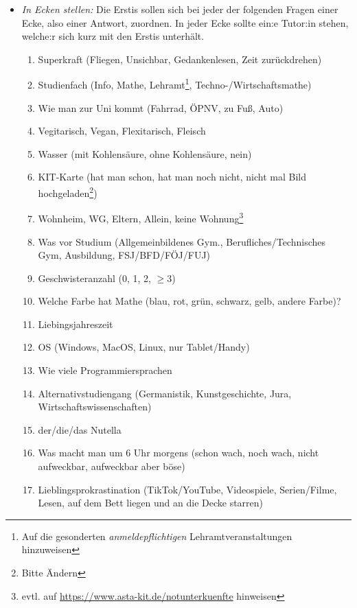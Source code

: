 \documentclass[10pt,ngerman]{scrartcl}
\begin{document}
\begin{multicols}{2}
\begin{itemize}
    \item \emph{In Ecken stellen:} Die Erstis sollen sich bei jeder der
        folgenden Fragen einer Ecke, also einer Antwort, zuordnen. In jeder Ecke
        sollte ein:e Tutor:in stehen, welche:r sich kurz mit den Erstis
        unterhält.
        \begin{enumerate}
            \item Superkraft (Fliegen, Unsichbar, Gedankenlesen, Zeit zurückdrehen)
            \item Studienfach (Info, Mathe, Lehramt\footnote{Auf die gesonderten \emph{anmeldepflichtigen} Lehramtveranstaltungen hinzuweisen}, Techno-/Wirtschaftsmathe)
            \item Wie man zur Uni kommt (Fahrrad, ÖPNV, zu Fuß, Auto)
            \item Vegitarisch, Vegan, Flexitarisch, Fleisch
            \item Wasser (mit Kohlensäure, ohne Kohlensäure, nein)
            \item KIT-Karte (hat man schon, hat man noch nicht, nicht mal Bild hochgeladen\footnote{Bitte Ändern})
            \item Wohnheim, WG, Eltern, Allein, keine Wohnung\footnote{evtl. auf \href{https://www.asta-kit.de/notunterkuenfte}{https://www.asta-kit.de/notunterkuenfte} hinweisen}
            \item Was vor Studium (Allgemeinbildenes Gym., Berufliches/Technisches Gym, Ausbildung, FSJ/BFD/FÖJ/FUJ)
            \item Geschwisteranzahl (0, 1, 2, $\geq 3$)
            \item Welche Farbe hat Mathe (blau, rot, grün, schwarz, gelb, andere Farbe)?
            \item Liebingsjahreszeit 
            \item OS (Windows, MacOS, Linux, nur Tablet/Handy)
            \item Wie viele Programmiersprachen
            \item Alternativstudiengang (Germanistik, Kunstgeschichte, Jura, Wirtschaftswissenschaften)
            \item der/die/das Nutella
            \item Was macht man um 6 Uhr morgens (schon wach, noch wach, nicht aufweckbar, aufweckbar aber böse)
            \item Lieblingsprokrastination (TikTok/YouTube, Videospiele, Serien/Filme, Lesen, auf dem Bett liegen und an die Decke starren)
        \end{enumerate}


\end{itemize}
\end{multicols}
\end{document}
